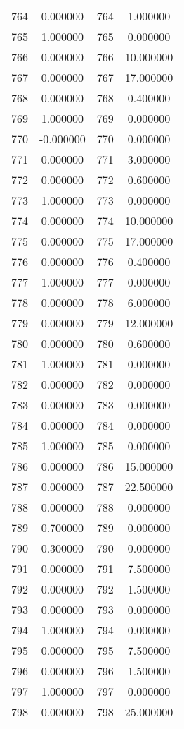 \documentclass[12pt]{article}
\begin{document}
\begin{longtable}{@{}cccc@{}}
764 & 0.000000 & 764 & 1.000000 \\
765 & 1.000000 & 765 & 0.000000 \\
766 & 0.000000 & 766 & 10.000000 \\
767 & 0.000000 & 767 & 17.000000 \\
768 & 0.000000 & 768 & 0.400000 \\
769 & 1.000000 & 769 & 0.000000 \\
770 & -0.000000 & 770 & 0.000000 \\
771 & 0.000000 & 771 & 3.000000 \\
772 & 0.000000 & 772 & 0.600000 \\
773 & 1.000000 & 773 & 0.000000 \\
774 & 0.000000 & 774 & 10.000000 \\
775 & 0.000000 & 775 & 17.000000 \\
776 & 0.000000 & 776 & 0.400000 \\
777 & 1.000000 & 777 & 0.000000 \\
778 & 0.000000 & 778 & 6.000000 \\
779 & 0.000000 & 779 & 12.000000 \\
780 & 0.000000 & 780 & 0.600000 \\
781 & 1.000000 & 781 & 0.000000 \\
782 & 0.000000 & 782 & 0.000000 \\
783 & 0.000000 & 783 & 0.000000 \\
784 & 0.000000 & 784 & 0.000000 \\
785 & 1.000000 & 785 & 0.000000 \\
786 & 0.000000 & 786 & 15.000000 \\
787 & 0.000000 & 787 & 22.500000 \\
788 & 0.000000 & 788 & 0.000000 \\
789 & 0.700000 & 789 & 0.000000 \\
790 & 0.300000 & 790 & 0.000000 \\
791 & 0.000000 & 791 & 7.500000 \\
792 & 0.000000 & 792 & 1.500000 \\
793 & 0.000000 & 793 & 0.000000 \\
794 & 1.000000 & 794 & 0.000000 \\
795 & 0.000000 & 795 & 7.500000 \\
796 & 0.000000 & 796 & 1.500000 \\
797 & 1.000000 & 797 & 0.000000 \\
798 & 0.000000 & 798 & 25.000000 \\

\end{longtable}
\end{document}
